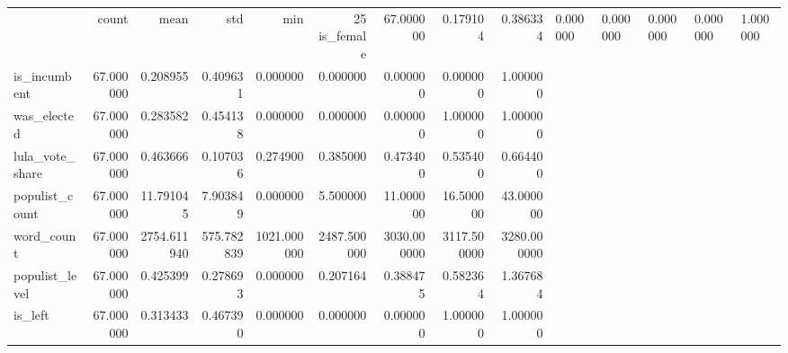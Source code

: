 \begin{tabular}{lrrrrrrrr}
\toprule
 & count & mean & std & min & 25%
\midrule
is_female & 67.000000 & 0.179104 & 0.386334 & 0.000000 & 0.000000 & 0.000000 & 0.000000 & 1.000000 \\
is_incumbent & 67.000000 & 0.208955 & 0.409631 & 0.000000 & 0.000000 & 0.000000 & 0.000000 & 1.000000 \\
was_elected & 67.000000 & 0.283582 & 0.454138 & 0.000000 & 0.000000 & 0.000000 & 1.000000 & 1.000000 \\
lula_vote_share & 67.000000 & 0.463666 & 0.107036 & 0.274900 & 0.385000 & 0.473400 & 0.535400 & 0.664400 \\
populist_count & 67.000000 & 11.791045 & 7.903849 & 0.000000 & 5.500000 & 11.000000 & 16.500000 & 43.000000 \\
word_count & 67.000000 & 2754.611940 & 575.782839 & 1021.000000 & 2487.500000 & 3030.000000 & 3117.500000 & 3280.000000 \\
populist_level & 67.000000 & 0.425399 & 0.278693 & 0.000000 & 0.207164 & 0.388475 & 0.582364 & 1.367684 \\
is_left & 67.000000 & 0.313433 & 0.467390 & 0.000000 & 0.000000 & 0.000000 & 1.000000 & 1.000000 \\
\bottomrule
\end{tabular}
